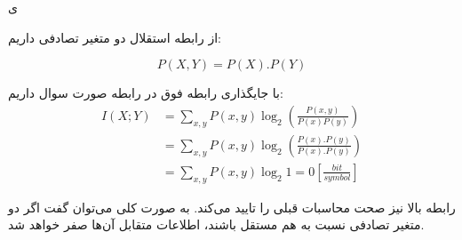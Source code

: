\SubProblem
{ی}
{
    از رابطه استقلال دو متغیر تصادفی داریم: 
    
    \begin{equation*}
        P(X,Y) = P(X).P(Y)
    \end{equation*}
    
    با جایگذاری رابطه فوق در رابطه صورت سوال داریم:
    \begin{equation*}
    \begin{aligned}
        I(X;Y) &= \sum_{x,y}^{}P(x,y)\log_2(\frac{P(x,y)}{P(x)P(y)})\\
        &=\sum_{x,y}^{}P(x,y)\log_2(\frac{P(x).P(y)}{P(x).P(y)})\\
        &=\sum_{x,y}^{}P(x,y)\log_2 1 = 0 [\frac{bit}{symbol}]
    \end{aligned}
    \end{equation*}
    
    رابطه بالا نیز صحت محاسبات قبلی را تایید می‌کند. به صورت کلی می‌توان گفت اگر دو متغیر تصادفی نسبت به هم مستقل باشند، اطلاعات متقابل آن‌ها صفر خواهد شد.
}